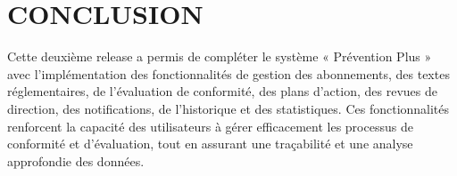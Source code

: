 \section*{CONCLUSION}
\noindent Cette deuxième release a permis de compléter le système « Prévention Plus » avec l'implémentation des fonctionnalités de gestion des abonnements, des textes réglementaires, de l'évaluation de conformité, des plans d'action, des revues de direction, des notifications, de l'historique et des statistiques. Ces fonctionnalités renforcent la capacité des utilisateurs à gérer efficacement les processus de conformité et d'évaluation, tout en assurant une traçabilité et une analyse approfondie des données.